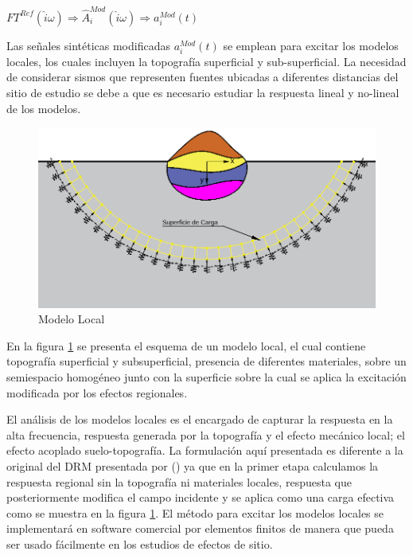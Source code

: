 \documentclass[spanish,letterpaper,12pt,twoside,openany]{article}
\begin{document}
\begin{large}
	$FT^{Ref} \left( \hat{i} \omega \right) \Rightarrow \widehat{A}^{Mod}_{i} \left( \hat{i} \omega \right) \Rightarrow a_{i}^{Mod}\left( t \right)$
\end{large}

Las señales sintéticas modificadas $a_{i}^{Mod}\left( t \right)$ se emplean para excitar los modelos locales, los cuales incluyen la topografía superficial y sub-superficial. La necesidad de considerar sismos que representen fuentes ubicadas a diferentes distancias del sitio de estudio se debe a que es necesario estudiar la respuesta lineal y no-lineal de los modelos.

\begin{figure}[H]
	\centering
	\includegraphics[width=12 cm]{img/Local.pdf}
	\vspace{-.5 cm}
	\caption{Modelo Local}
	\label{fig:local}
	\vspace{-1 cm}
\end{figure}
%
En la figura \ref{fig:local} se presenta el esquema de un modelo local, el cual contiene topografía superficial y subsuperficial, presencia de diferentes materiales, sobre un semiespacio homogéneo junto con la superficie sobre la cual se aplica la excitación modificada por los efectos regionales.

El análisis de los modelos locales es el encargado de capturar la respuesta en la alta frecuencia, respuesta generada por la topografía y el efecto mecánico local; el efecto acoplado suelo-topografía. La formulación aquí presentada es diferente a la original del DRM presentada por \citeauthor{bielak2003} (\citeyear{bielak2003}) ya que en la primer etapa calculamos la respuesta regional sin la topografía ni materiales locales, respuesta que posteriormente modifica el campo incidente y se aplica como una carga efectiva como se muestra en la figura \ref{fig:local}. El método para excitar los modelos locales se implementará en software comercial por elementos finitos de manera que pueda ser usado fácilmente en los estudios de efectos de sitio.
\end{document}
